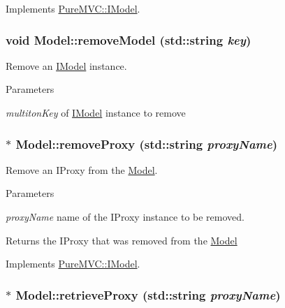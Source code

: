 Implements \hyperlink{class_pure_m_v_c_1_1_i_model_a538f7de97ba62dcce4d0144e88055d0b}{PureMVC::IModel}.\hypertarget{class_pure_m_v_c_1_1_model_af815e60f9acb32c0be2a2d5377f39bb7}{
\subsubsection[{removeModel}]{\setlength{\rightskip}{0pt plus 5cm}void Model::removeModel (std::string {\em key})}}
\label{class_pure_m_v_c_1_1_model_af815e60f9acb32c0be2a2d5377f39bb7}


Remove an \hyperlink{class_pure_m_v_c_1_1_i_model}{IModel} instance. 
\begin{DoxyParams}{Parameters}
\item[{\em multitonKey}]of \hyperlink{class_pure_m_v_c_1_1_i_model}{IModel} instance to remove \end{DoxyParams}
\hypertarget{class_pure_m_v_c_1_1_model_a453947b6a8f925304515ac58078f5e57}{
\subsubsection[{removeProxy}]{ $\ast$ Model::removeProxy (std::string {\em proxyName})}}
\label{class_pure_m_v_c_1_1_model_a453947b6a8f925304515ac58078f5e57}


Remove an {\ttfamily IProxy} from the {\ttfamily \hyperlink{class_pure_m_v_c_1_1_model}{Model}}. 
\begin{DoxyParams}{Parameters}
\item[{\em proxyName}]name of the {\ttfamily IProxy} instance to be removed. \end{DoxyParams}
\begin{DoxyReturn}{Returns}
the {\ttfamily IProxy} that was removed from the {\ttfamily \hyperlink{class_pure_m_v_c_1_1_model}{Model}} 
\end{DoxyReturn}


Implements \hyperlink{class_pure_m_v_c_1_1_i_model_a40caa7c04f887dda157125d94267fff9}{PureMVC::IModel}.\hypertarget{class_pure_m_v_c_1_1_model_acba552053974de59cf6bdac940265634}{
\subsubsection[{retrieveProxy}]{ $\ast$ Model::retrieveProxy (std::string {\em proxyName})}}
\label{class_pure_m_v_c_1_1_model_acba552053974de59cf6bdac940265634}


